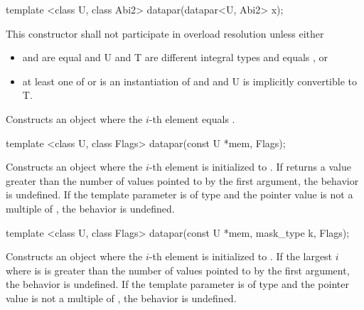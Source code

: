 
\begin{itemdecl}
template <class U, class Abi2> datapar(datapar<U, Abi2> x);
\end{itemdecl}
\begin{itemdescr}
  \pnum\remarks This constructor shall not participate in overload resolution unless either
  \begin{itemize}
    \item {} and  are equal and
      \type U and \type T are different integral types and
       equals , or
    \item at least one of  or  is an instantiation of \fixedsizescoped and  and \type U is implicitly convertible to \type T.
  \end{itemize}
  \pnum\effects Constructs an object where the $i$-th element equals  \foralli.
\end{itemdescr}

\begin{itemdecl}
template <class U, class Flags> datapar(const U *mem, Flags);
\end{itemdecl}
\begin{itemdescr}
  \pnum\effects Constructs an object where the $i$-th element is initialized to  \foralli.
  \pnum\remarks If  returns a value greater than the number of values pointed to by the first argument, the behavior is undefined.
  \pnum\remarks If the  template parameter is of type  and the pointer value is not a multiple of , the behavior is undefined.
\end{itemdescr}

\begin{itemdecl}
template <class U, class Flags> datapar(const U *mem, mask_type k, Flags);
\end{itemdecl}
\begin{itemdescr}
  \pnum\effects Constructs an object where the $i$-th element is initialized to  \foralli.
  \pnum\remarks If the largest $i$ where  is \true is greater than the number of values pointed to by the first argument, the behavior is undefined.
  \pnum\remarks If the  template parameter is of type  and the pointer value is not a multiple of , the behavior is undefined.
\end{itemdescr}

